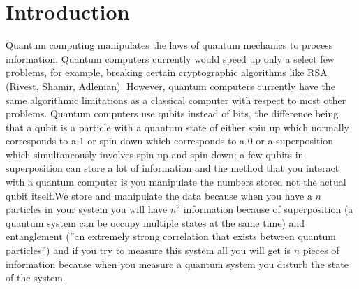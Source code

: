\documentclass{article}
\begin{document}
\section{Introduction}
Quantum computing manipulates the laws of quantum mechanics to process information. Quantum computers currently would speed up only a select few problems, for example, breaking certain cryptographic algorithms like RSA (Rivest, Shamir, Adleman). However, quantum computers currently have the same algorithmic limitations as a classical computer with respect to most other problems. Quantum computers use qubits instead of bits, the difference being that a qubit is a particle with a quantum state of either spin up which normally corresponds to a 1 or spin down which corresponds to a 0 or a superposition which simultaneously involves spin up and spin down; a few qubits in superposition can store a lot of information and the method that you interact with a quantum computer is you manipulate the numbers stored not the actual qubit itself.We store and manipulate the data because when you have a $n$ particles in your system you will have $n^2$ information because of superposition (a quantum
system can be occupy multiple states at the same time)\cite{Vazirani2004} and entanglement (”an
extremely strong correlation that exists between quantum particles”)\cite{Vazirani2004} and if
you try to measure this system all you will get is $n$ pieces of information because when you measure a quantum system you disturb the state of the system.
\end{document}
